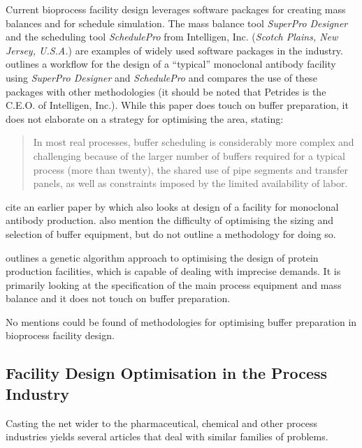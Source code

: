 Current bioprocess facility design leverages software packages for creating mass
balances and for schedule simulation.  The mass balance tool
\emph{SuperPro Designer\textsuperscript{\textregistered}} 
and the scheduling tool \emph{SchedulePro\textsuperscript{\textregistered}}
from Intelligen, Inc. (\emph{Scotch Plains, New Jersey, U.S.A.}) are examples of
widely used software packages in the industry.
\citet{Petrides:2014} outlines a workflow for the design of a ``typical''
monoclonal antibody facility using 
\emph{SuperPro Designer\textsuperscript{\textregistered}} and
\emph{SchedulePro\textsuperscript{\textregistered}} and compares the use of
these packages with other methodologies (it should be noted that Petrides is the 
C.E.O. of Intelligen, Inc.).  While this paper does touch on buffer preparation,
it does not elaborate on a strategy for optimising the area, stating:
\begin{quote}In most real processes, buffer scheduling is considerably more
complex and challenging because of the larger number of buffers required for a
typical process (more than twenty), the shared use of pipe segments and transfer
panels, as well as constraints imposed by the limited availability of labor.
\end{quote}
\citet{Petrides:2014} cite an earlier paper by \citet{Toumi:2010} which also
looks at design of a facility for monoclonal antibody production.
\citet{Toumi:2010} also mention the difficulty of optimising the sizing and 
selection of buffer equipment, but do not outline a methodology for doing so.


\citet{Dietz:2008} outlines a genetic algorithm approach to optimising the 
design of protein production facilities, which is capable of dealing with
imprecise demands.  It is primarily looking at the specification of the main
process equipment and mass balance and it does not touch on buffer preparation.

No mentions could be found of methodologies for optimising buffer preparation in
bioprocess facility design.

\subsection{Facility Design Optimisation in the Process Industry}
\label{SS.fdopi}
Casting the net wider to the pharmaceutical, chemical and other process
industries yields several articles that deal with similar families of problems.


